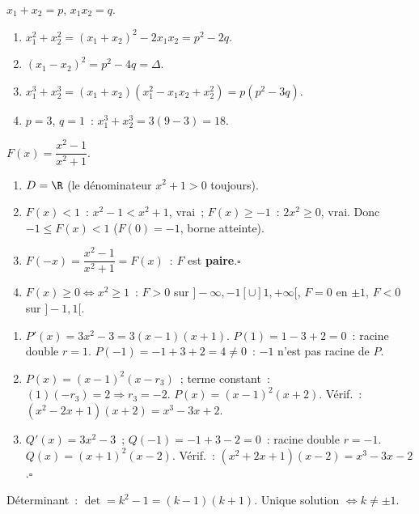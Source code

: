 $x_1+x_2=p$, $x_1x_2=q$.
\begin{enumerate}
  \item $x_1^2+x_2^2=(x_1+x_2)^2-2x_1x_2=p^2-2q$.
  \item $(x_1-x_2)^2=p^2-4q=\Delta$.
  \item $x_1^3+x_2^3=(x_1+x_2)(x_1^2-x_1x_2+x_2^2)=p(p^2-3q)$.
  \item $p=3$, $q=1$~: $x_1^3+x_2^3=3(9-3)=18$.\checkmark
\end{enumerate}


$F(x)=\dfrac{x^2-1}{x^2+1}$.
\begin{enumerate}
  \item $D=\R$ (le d\'enominateur $x^2+1>0$ toujours).
  \item $F(x)<1$~: $x^2-1<x^2+1$, vrai~; $F(x)\geq-1$~: $2x^2\geq0$, vrai.
        Donc $-1\leq F(x)<1$ ($F(0)=-1$, borne atteinte).
  \item $F(-x)=\dfrac{x^2-1}{x^2+1}=F(x)$~: $F$ est \textbf{paire}.\hfill$\square$
  \item $F(x)\geq0\Leftrightarrow x^2\geq1$~: $F>0$ sur $]-\infty,-1[\cup]1,+\infty[$,
        $F=0$ en $\pm1$, $F<0$ sur $]-1,1[$.
\end{enumerate}


\begin{enumerate}
  \item $P'(x)=3x^2-3=3(x-1)(x+1)$. $P(1)=1-3+2=0$~: racine double $r=1$.
        $P(-1)=-1+3+2=4\ne0$~: $-1$ n'est pas racine de $P$.
  \item $P(x)=(x-1)^2(x-r_3)$~; terme constant~: $(1)(-r_3)=2\Rightarrow r_3=-2$.
        $P(x)=(x-1)^2(x+2)$. V\'erif.~: $(x^2-2x+1)(x+2)=x^3-3x+2$.\checkmark
  \item $Q'(x)=3x^2-3$~; $Q(-1)=-1+3-2=0$~: racine double $r=-1$.
        $Q(x)=(x+1)^2(x-2)$. V\'erif.~: $(x^2+2x+1)(x-2)=x^3-3x-2$.\checkmark\hfill$\square$
\end{enumerate}


D\'eterminant~: $\det=k^2-1=(k-1)(k+1)$.
Unique solution $\Leftrightarrow k\ne\pm1$.

